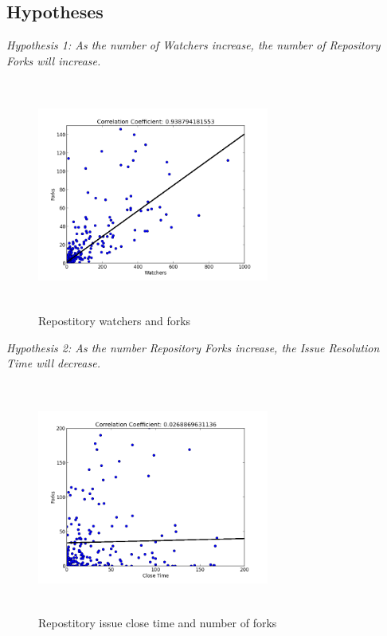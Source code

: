 \documentclass{proc}
\begin{document}
\subsection{Hypotheses}
\emph{Hypothesis 1: As the number of Watchers increase, the number of Repository Forks will increase.}\\
\begin{figure}
\includegraphics[height=3in,width=3in]{images/watcher_forks_scatterplot.png}
\caption{Repostitory watchers and forks}
\end{figure}

\emph{Hypothesis 2: As the number Repository Forks increase, the Issue Resolution Time will decrease.}\\
\begin{figure}
\includegraphics[height=3in,width=3in]{images/issue_close_time_forks_scatterplot.png}
\caption{Repostitory issue close time and number of forks}
\end{figure}
\end{document}

